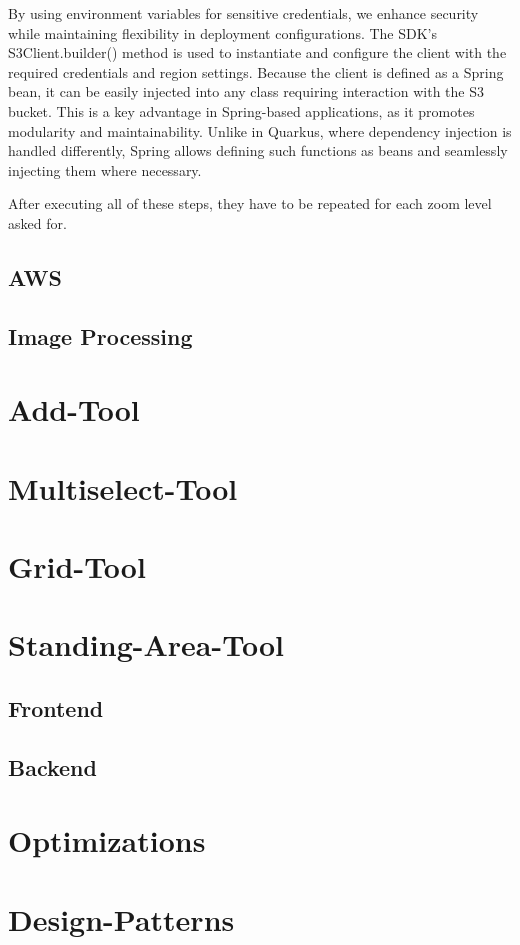 By using environment variables for sensitive credentials, we enhance security while maintaining flexibility in deployment configurations.
The SDK’s S3Client.builder() method is used to instantiate and configure the client with the required credentials and region settings. Because the client is defined as a Spring bean, it can be easily injected into any class requiring interaction with the S3 bucket. This is a key advantage in Spring-based applications, as it promotes modularity and maintainability. Unlike in Quarkus, where dependency injection is handled differently, Spring allows defining such functions as beans and seamlessly injecting them where necessary.

After executing all of these steps, they have to be repeated for each zoom level asked for. 



\subsection{AWS}

\subsection{Image Processing}

\section{Add-Tool}

\section{Multiselect-Tool}

\section{Grid-Tool}

\section{Standing-Area-Tool}

\subsection{Frontend}

\subsection{Backend}

\section{Optimizations}

\section{Design-Patterns}
